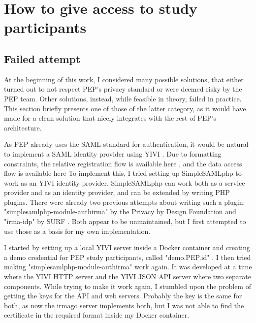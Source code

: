 \documentclass{report}
\begin{document}
\section{How to give access to study participants}
\subsection{Failed attempt}
At the beginning of this work, I considered many possible solutions, that either turned out to not respect PEP's privacy standard or were deemed risky by the PEP team. Other
solutions, instead, while feasible in theory, failed in practice. This section briefly presents one of those of the latter category, as it would have made for a clean solution that
nicely integrates with the rest of PEP's architecture. \par
As PEP already uses the SAML standard \cite{sstc-saml-core-errata-2.0-wd-07} for authentication, it would be natural to implement a SAML identity provider using YIVI \cite{irma-app}.
Due to formatting constraints, the relative registration flow is available here \cite{registration-flow-bpmn-diagram}, and the data access flow is available here
\cite{data-access-failed-attempt-bpmn-diagram}
To implement this, I tried setting up SimpleSAMLphp \cite{simplesamlphp} to work as an YIVI \cite{about-irma} identity provider. SimpleSAMLphp can work both as a service provider and
as an identity provider, and can be extended by writing PHP plugins. There were already two previous attempts about writing such a plugin: 
"simplesamlphp-module-authirma" \cite{simplesamlphp-module-authirma} by the Privacy by Design Foundation \cite{privacybydesignfoundation} and "irma-idp" \cite{irma-idp} by SURF \cite{surf}.
Both appear to be unmaintained, but I first attempted to use those as a basis for my own implementation. \par
I started by setting up a local YIVI server inside a Docker container and creating a demo credential \cite{irma-docs-issuer} for PEP study participants, called "demo.PEP.id" . I
then tried making "simplesamlphp-module-authirma" work again. It was developed at a time where the YIVI HTTP server and the YIVI JSON API server where two separate components. While
trying to make it work again, I stumbled upon the problem of getting the keys for the API and web servers. Probably the key is the same for both, as now the irmago
server \cite{irma-docs-server} implements both, but I was not able to find the certificate in the required format inside my Docker container. \par
\end{document}
